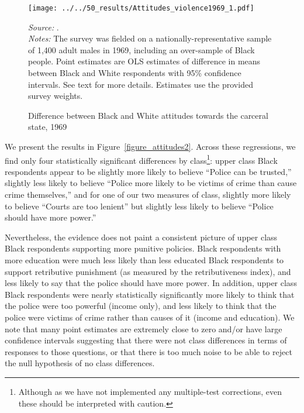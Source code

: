 \documentclass[12pt]{article}
\begin{document}
\begin{figure}[h!]
 \begin{center}
 \caption{Difference between Black and White attitudes towards the carceral state, 1969}
 \small
		 \texttt{[image: ../../50\_results/Attitudes\_violence1969\_1.pdf]}
 \label{figure_attitudes_class}
 	\end{center}
 	{\scriptsize{\emph{Source:} . }} \\
	{\scriptsize{\emph{Notes:} The survey was fielded on a nationally-representative sample of 1,400 adult males in 1969, including an over-sample of Black people.  Point estimates are OLS estimates of difference in means between Black and White respondents with 95\% confidence intervals.  See text for more details. Estimates use the provided survey weights. \singlespacing }}
\end{figure} \normalsize


We present the results in Figure~\ref{figure_attitudes2}. Across these regressions, we find only four statistically significant differences by class\footnote{Although as we have not implemented any multiple-test corrections, even these should be interpreted with caution.}: upper class Black respondents appear to be slightly more likely to believe ``Police can be trusted,'' slightly less likely to believe ``Police more likely to be victims of crime than cause crime themselves,'' and for one of our two measures of class, slightly more likely to believe ``Courts are too lenient'' but slightly less likely to believe ``Police should have more power.''

Nevertheless, the evidence does not paint a consistent picture of upper class Black respondents supporting more punitive policies. Black respondents with more education were much less likely than less educated Black respondents to support retributive punishment (as measured by the retributiveness index), and less likely to say that the police should have more power.  In addition, upper class Black respondents were nearly statistically significantly more likely to think that the police were too powerful (income only), and less likely to think that the police were victims of crime rather than causes of it (income and education).  We note that many point estimates are extremely close to zero and/or have large confidence intervals suggesting that there were not class differences in terms of responses to those questions, or that there is too much noise to be able to reject the null hypothesis of no class differences.
\end{document}
